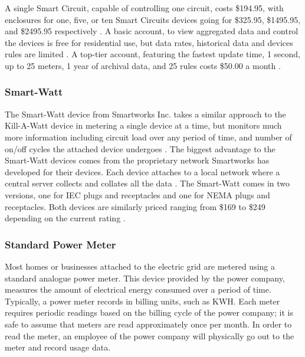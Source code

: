 A single Smart Circuit, capable of controlling one circuit, costs \$194.95, with enclosures for one, five, or ten Smart Circuits devices going for \$325.95, \$1495.95, and \$2495.95 respectively \cite{WattsUpDatasheet}. A basic account, to view aggregated data and control the devices is free for residential use, but data rates, historical data and devices rules are limited \cite{WattsUpServices}. A top-tier account, featuring the fastest update time, 1 second, up to 25 meters, 1 year of archival data, and 25 rules costs \$50.00 a month \cite{WattsUpServices}.

\subsubsection{Smart-Watt} %
The Smart-Watt device from Smartworks Inc. takes a similar approach to the Kill-A-Watt device in metering a single device at a time, but monitors much more information including circuit load over any period of time, and number of on/off cycles the attached device undergoes \cite{SmartWattBrochure}. The biggest advantage to the Smart-Watt devices comes from the proprietary network Smartworks has developed for their devices. Each device attaches to a local network where a central server collects and collates all the data \cite{SmartWattBrochure}. The Smart-Watt comes in two versions, one for \ac{IEC} plugs and receptacles and one for \ac{NEMA} plugs and receptacles. Both devices are similarly priced ranging from \$169 to \$249 depending on the current rating \cite{SmartWattBrochure}.

\subsubsection{Standard Power Meter} %
Most homes or businesses attached to the electric grid are metered using a standard analogue power meter. This device provided by the power company, measures the amount of electrical energy consumed over a period of time. Typically, a power meter records in billing units, such as KWH. Each meter requires periodic readings based on the billing cycle of the power company; it is safe to assume that meters are read approximately once per month. In order to read the meter, an employee of the power company will physically go out to the meter and record usage data.

